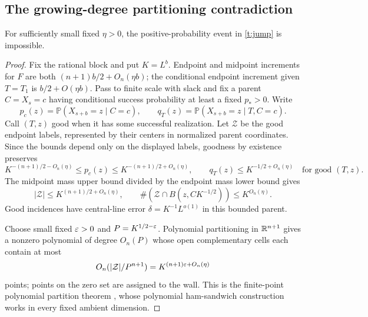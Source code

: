 \subsection{The growing-degree partitioning contradiction}

\begin{lemma}\label{t:no-jump}
For sufficiently small fixed $\eta>0$, the positive-probability event
in \eqref{t:jump} is impossible.
\end{lemma}

\begin{proof}
Fix the rational block and put $K=L^b$.  Endpoint and midpoint
increments for $F$ are both $(n+1)b/2+O_n(\eta b)$; the conditional
endpoint increment given $T=T_1$ is $b/2+O(\eta b)$.
Pass to finite scale with slack and fix a parent $C=X_s=c$ having
conditional success probability at least a fixed $p_*>0$.  Write
\[
 p_c(z)=\mathbb P(X_{s+b}=z\mid C=c),\qquad
 q_T(z)=\mathbb P(X_{s+b}=z\mid T,C=c).
\]
Call $(T,z)$ good when it has some successful realization.  Let
$\mathcal Z$ be the good endpoint labels, represented by their centers
in normalized parent coordinates.  Since the bounds depend only on
the displayed labels, goodness by existence preserves
\begin{equation}\label{t:good-masses}
 K^{-(n+1)/2-O_n(\eta)}\le p_c(z)
       \le K^{-(n+1)/2+O_n(\eta)},\qquad
 q_T(z)\le K^{-1/2+O_n(\eta)}\quad\text{for good }(T,z).
\end{equation}
The midpoint mass upper bound divided by the endpoint mass lower
bound gives
\begin{equation}\label{t:good-counts}
 |\mathcal Z|\le K^{(n+1)/2+O_n(\eta)},\qquad
 \#(\mathcal Z\cap B(z,CK^{-1/2}))\le K^{O_n(\eta)}.
\end{equation}
Good incidences have central-line error
$\delta=K^{-1}L^{o(1)}$ in this bounded parent.

Choose small fixed $\varepsilon>0$ and $P=K^{1/2-\varepsilon}$.  Polynomial
partitioning in $\mathbb R^{n+1}$ gives a nonzero polynomial of degree $O_n(P)$
whose open complementary cells each contain at most
\begin{equation}\label{t:partition-occupancy}
 O_n(|\mathcal Z|/P^{n+1})=K^{(n+1)\varepsilon+O_n(\eta)}
\end{equation}
points; points on the zero set are assigned to the wall.  This is the
finite-point polynomial partition theorem
\citep[Theorem~4.1]{GuthKatz2015}, whose polynomial ham-sandwich
construction works in every fixed ambient dimension.


\end{proof}
